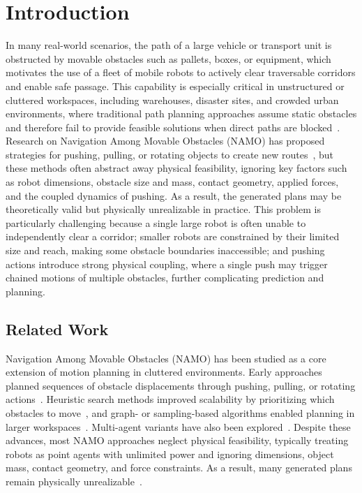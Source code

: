 \section{Introduction}\label{sec:intro}
In many real-world scenarios, the path of a large vehicle or transport unit is obstructed by
movable obstacles such as pallets, boxes, or equipment, which motivates the use of a fleet of
mobile robots to actively clear traversable corridors and enable safe passage. This capability
is especially critical in unstructured or cluttered workspaces, including warehouses, disaster
sites, and crowded urban environments, where traditional path planning approaches assume
static obstacles and therefore fail to provide feasible solutions when direct paths are
blocked~\cite{liu2023path}. Research on Navigation Among Movable Obstacles (NAMO) has proposed strategies
for pushing, pulling, or rotating objects to create new routes~\cite{stilman2005navigation}, but these methods often
abstract away physical feasibility, ignoring key factors such as robot dimensions, obstacle
size and mass, contact geometry, applied forces, and the coupled dynamics of pushing. As a
result, the generated plans may be theoretically valid but physically unrealizable in practice.
This problem is particularly challenging because a single large robot is often unable to
independently clear a corridor; smaller robots are constrained by their limited size and reach,
making some obstacle boundaries inaccessible; and pushing actions introduce strong physical
coupling, where a single push may trigger chained motions of multiple obstacles, further
complicating prediction and planning.

\subsection{Related Work}\label{subsec:intro-related}
Navigation Among Movable Obstacles (NAMO) has been studied as a core
extension of motion planning in cluttered environments. Early approaches
planned sequences of obstacle displacements through pushing, pulling, or
rotating actions~\cite{stilman2005navigation}. Heuristic search methods improved scalability
by prioritizing which obstacles to move~\cite{stilman2007manipulation}, and graph- or
sampling-based algorithms enabled planning in larger workspaces~\cite{yao2024local}.
Multi-agent variants have also been explored~\cite{tang2024collaborative}. Despite these
advances, most NAMO approaches neglect physical feasibility, typically
treating robots as point agents with unlimited power and ignoring
dimensions, object mass, contact geometry, and force constraints. As a
result, many generated plans remain physically unrealizable~\cite{ren2025search}.

